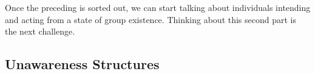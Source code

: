 \documentclass[
11pt,
titlepage,
reqno,
]{article}%
\theoremstyle{definition}
\begin{document}
	Once the preceding is sorted out, we can start talking about individuals intending and acting from a state of group existence. Thinking about this second part is the next challenge. %
	
	
	
	
	
	\subsection{Unawareness Structures}
	
\end{document}
